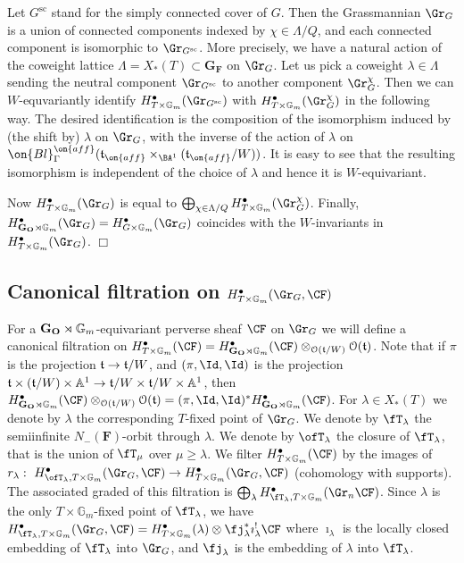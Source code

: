 \documentclass[11pt]{amsart}
\theoremstyle{definition}
\theoremstyle{remark}
\renewcommand{\O}{{\mathcal O}}
\theoremstyle{remark}
\newcommand{\cal}{\mathcal}
\newcommand{\<}{\langle}
\renewcommand{\>}{\rangle}
\renewcommand{\t}{{\frak t}}
\renewcommand{\O}{{\cal O}}
\newcommand{\GO}{{\bf G_O}}
\newcommand{\Aone}{{\mathbb A}^1}
\newcommand{\Gm}{{{\mathbb G}_m}}
\begin{document}
Let $G^{\mathrm{sc}}$ stand for the simply connected cover of $G$. Then the
Grassmannian $\Gr_G$ is a union of connected components indexed by 
$\chi\in\Lambda/Q$, and each connected component is isomorphic
to $\Gr_{G^{\mathrm{sc}}}$. More precisely, we have a natural action of the coweight lattice
$\Lambda=X_*(T)\subset{\mathbf G}_{\mathbf F}$ on $\Gr_G$. Let us pick a coweight
$\lambda\in\Lambda$ sending the neutral component $\Gr_{G^{\mathrm{sc}}}$ to another component
$\Gr_G^\chi$. Then we can $W$-equvariantly identify $H^\bullet_{T\times\Gm}(\Gr_{G^{\mathrm{sc}}})$
with $H^\bullet_{T\times\Gm}(\Gr_G^\chi)$ in the following way. The desired identification
is the composition of the isomorphism induced by (the shift by) $\lambda$ on $\Gr_G$,
with the inverse of the action of $\lambda$ on $\on{Bl}^{\on{aff}}_\Gamma(\t_{\on{aff}}\times_{\BA^1}(\t_{\on{aff}}/W))$.
It is easy to see that the resulting isomorphism is independent of the choice of $\lambda$ and hence it is
$W$-equivariant.

Now $H^\bullet_{T\times\Gm}(\Gr_G)$ is equal to $\bigoplus_{\chi\in\Lambda/Q}H^\bullet_{T\times\Gm}(\Gr_G^\chi)$. Finally,
$H^\bullet_{\GO\rtimes\Gm}(\Gr_G)=H^\bullet_{G\times\Gm}(\Gr_G)$ coincides
with the $W$-invariants in $H^\bullet_{T\times\Gm}(\Gr_G)$.
\hfill $\Box$


\subsection{Canonical filtration on $H^\bullet_{T\times\Gm}(\Gr_G,\CF)$}
\label{can}
For a $\GO\rtimes\Gm$-equivariant perverse sheaf $\CF$ on $\Gr_G$ we will
define a canonical filtration on $H^\bullet_{T\times\Gm}(\CF)=
H^\bullet_{\GO\rtimes\Gm}(\CF)\otimes_{\O(\t/W)}\O(\t)$. Note that
if $\pi$ is the projection $\t\to\t/W$, and $(\pi,\Id,\Id)$ is the 
projection $\t\times(\t/W)\times\Aone\to\t/W\times\t/W\times\Aone$,
then $H^\bullet_{\GO\rtimes\Gm}(\CF)\otimes_{\O(\t/W)}\O(\t)=
(\pi,\Id,\Id)^*H^\bullet_{\GO\rtimes\Gm}(\CF)$.
For $\lambda\in X_*(T)$ we denote by $\lambda$ the corresponding $T$-fixed
point of $\Gr_G$. We denote by $\fT_\lambda$ the semiinfinite 
$N_-({\mathbf F})$-orbit through $\lambda$.
We denote by $\ofT_\lambda$ the closure of $\fT_\lambda$, that is the union
of $\fT_\mu$ over $\mu\geq\lambda$. We filter
$H^\bullet_{T\times\Gm}(\CF)$ by the images of
$r_\lambda:\ H^\bullet_{\ofT_\lambda,T\times\Gm}(\Gr_G,\CF)\to
H^\bullet_{T\times\Gm}(\Gr_G,\CF)$ (cohomology with supports).
The associated graded of this filtration is 
$\bigoplus_\lambda H^\bullet_{\fT_\lambda,T\times\Gm}(\Gr_n\CF)$.
Since $\lambda$ is the only $T\times\Gm$-fixed point of $\fT_\lambda$, we have
$H^\bullet_{\fT_\lambda,T\times\Gm}(\Gr_G,\CF)=H^\bullet_{T\times\Gm}(\lambda)
\otimes\fj_\lambda^*\imath_\lambda^!\CF$ where $\imath_\lambda$ is the
locally closed embedding of $\fT_\lambda$ into $\Gr_G$, and 
$\fj_\lambda$ is the embedding of $\lambda$ into $\fT_\lambda$.
\end{document}

